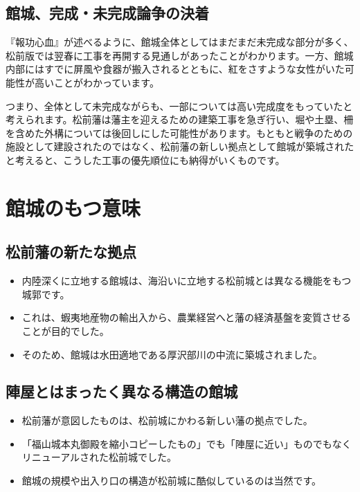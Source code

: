 \documentclass[11pt,report]{jsbook}
\begin{document}
\section{館城、完成・未完成論争の決着}
『報功心血』が述べるように、館城全体としてはまだまだ未完成な部分が多く、松前版では翌春に工事を再開する見通しがあったことがわかります。一方、館城内部にはすでに屏風や食器が搬入されるとともに、紅をさすような女性がいた可能性が高いことがわかっています。

つまり、全体として未完成ながらも、一部については高い完成度をもっていたと考えられます。松前藩は藩主を迎えるための建築工事を急ぎ行い、堀や土塁、柵を含めた外構については後回しにした可能性があります。もともと戦争のための施設として建設されたのではなく、松前藩の新しい拠点として館城が築城されたと考えると、こうした工事の優先順位にも納得がいくものです。


\chapter{館城のもつ意味}
\section{松前藩の新たな拠点}
\begin{itemize}
\item 内陸深くに立地する館城は、海沿いに立地する松前城とは異なる機能をもつ城郭です。
\item これは、蝦夷地産物の輸出入から、農業経営へと藩の経済基盤を変質させることが目的でした。
\item そのため、館城は水田適地である厚沢部川の中流に築城されました。
\end{itemize}

\section{陣屋とはまったく異なる構造の館城}
\begin{itemize}
\item 松前藩が意図したものは、松前城にかわる新しい藩の拠点でした。
\item 「福山城本丸御殿を縮小コピーしたもの」でも「陣屋に近い」ものでもなくリニューアルされた松前城でした。
\item 館城の規模や出入り口の構造が松前城に酷似しているのは当然です。
\end{itemize}

\end{document}
